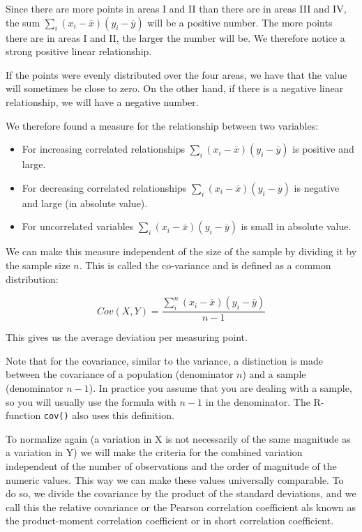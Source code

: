 Since there are more points in areas I and II than there are in areas III and IV, the sum $\sum_{i} (x_{i} - \overline{x}) (y_{i} - \overline{y})$ will be a positive number. The more points there are in areas I and II, the larger the number will be. We therefore notice a strong positive linear relationship.

If the points were evenly distributed over the four areas, we have that the value will sometimes be close to zero. On the other hand, if there is a negative linear relationship, we will have a negative number.

We therefore found a measure for the relationship between two variables:

\begin{itemize}
  \item For increasing correlated relationships  $\sum_{i} (x_{i} - \overline{x}) (y_{i} - \overline{y})$ is positive and large.
  \item For decreasing correlated relationships $\sum_{i} (x_{i} - \overline{x}) (y_{i} - \overline{y})$ is negative and large (in absolute value).
  \item For uncorrelated variables $\sum_{i} (x_{i} - \overline{x}) (y_{i} - \overline{y})$ is small in absolute value.
\end{itemize}

We can make this measure independent of the size of the sample by dividing it by the sample size $n$. This is called the co-variance and is defined as a common distribution:

\begin{equation}
  Cov(X,Y) = \frac{\sum_{i}^{n}(x_{i} - \overline{x}) (y_{i} - \overline{y})}{n - 1}
  \label{eq:covariance}
\end{equation}

This gives us the average deviation per measuring point.

Note that for the covariance, similar to the variance, a distinction is made between the covariance of a population (denominator $n$) and a sample (denominator $n-1$). In practice you assume that you are dealing with a sample, so you will usually use the formula with $n-1$ in the denominator. The R-function \texttt{cov()} also uses this definition.

To normalize again (a variation in X is not necessarily of the same magnitude as a variation in Y) we will make the criteria for the combined variation independent of the number of observations and the order of magnitude of the numeric values. This way we can make these values universally comparable. To do so, we divide the covariance by the product of the standard deviations, and we call this the relative covariance or the  Pearson correlation coefficient als known as the product-moment correlation coefficient or in short correlation coefficient.

